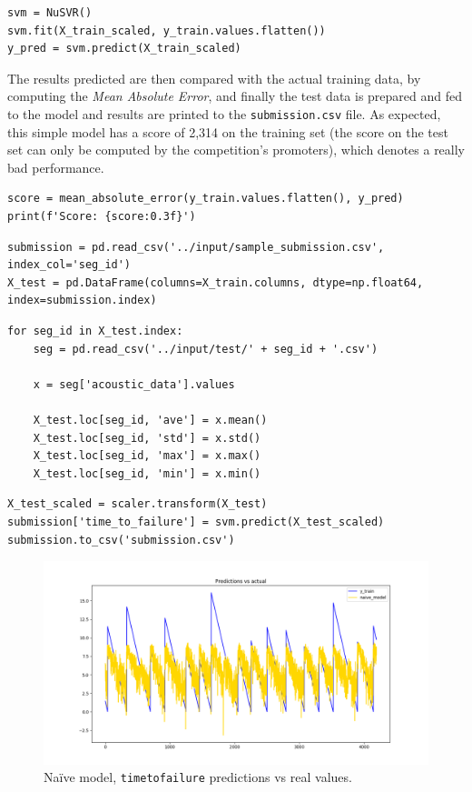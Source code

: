 \begin{lstlisting}[firstnumber=45]
svm = NuSVR()
svm.fit(X_train_scaled, y_train.values.flatten())
y_pred = svm.predict(X_train_scaled)
\end{lstlisting}

The results predicted are then compared with the actual training data, by computing the \textit{Mean Absolute Error}, and finally the test data is prepared and fed to the model and results are printed to the \texttt{submission.csv} file. As expected, this simple model has a score of 2,314 on the training set (the score on the test set can only be computed by the competition's promoters), which denotes a really bad performance.

\begin{lstlisting}[firstnumber=48]
score = mean_absolute_error(y_train.values.flatten(), y_pred)
print(f'Score: {score:0.3f}')
\end{lstlisting}

\begin{lstlisting}[firstnumber=50]
submission = pd.read_csv('../input/sample_submission.csv', index_col='seg_id')
X_test = pd.DataFrame(columns=X_train.columns, dtype=np.float64, index=submission.index)
\end{lstlisting}

\begin{lstlisting}[firstnumber=52]
for seg_id in X_test.index:
    seg = pd.read_csv('../input/test/' + seg_id + '.csv')
    
    x = seg['acoustic_data'].values
    
    X_test.loc[seg_id, 'ave'] = x.mean()
    X_test.loc[seg_id, 'std'] = x.std()
    X_test.loc[seg_id, 'max'] = x.max()
    X_test.loc[seg_id, 'min'] = x.min()
\end{lstlisting}

\begin{lstlisting}[firstnumber=61]
X_test_scaled = scaler.transform(X_test)
submission['time_to_failure'] = svm.predict(X_test_scaled)
submission.to_csv('submission.csv')
\end{lstlisting}

\begin{figure} [h]
	\centering
	\includegraphics[width=1\linewidth]{pictures/naive.png}
	\caption{Na{\"i}ve model, \texttt{time\textunderscore to\textunderscore failure} predictions vs real values.}
	\label{fig:LR}
\end{figure}